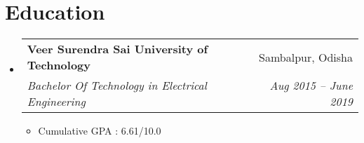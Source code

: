 \documentclass[letterpaper, 11pt]{article}
\makeatletter
\newcommand{\resumeItem}[1]{ \item\small{ {#1 \vspace{-2pt}} } }
\newcommand{\resumeSubheading}[4]{
\vspace{-2pt}
\item
\begin{tabular*}{0.97\textwidth}[t]{l@{\extracolsep{\fill}}r}
	\textbf{#1}       & #2                 \\
	\textit{\small#3} & \textit{\small #4} \\
\end{tabular*}
\vspace{-7pt}
}
\newcommand{\resumeSubHeadingListStart}{\begin{itemize}[leftmargin=0.15in, label={}]}
\newcommand{\resumeSubHeadingListEnd}{\end{itemize}}
\newcommand{\resumeItemListStart}{\begin{itemize}}
\newcommand{\resumeItemListEnd}{\end{itemize}
\vspace{-5pt}}
\makeatother
\begin{document}
	\section{Education}
	\resumeSubHeadingListStart \resumeSubheading {Veer Surendra Sai University of Technology}{Sambalpur, Odisha}
	{Bachelor Of Technology in Electrical Engineering}{Aug 2015 -- June 2019} \resumeItemListStart
	\resumeItem{Cumulative GPA : {6.61/10.0}} \resumeItemListEnd
	\resumeSubHeadingListEnd

\end{document}
